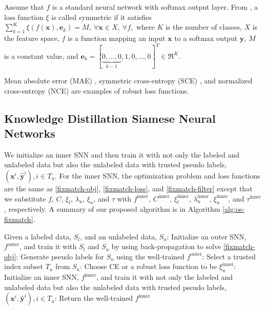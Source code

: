 \documentclass{article}
\def\bx{{\boldsymbol x}}
\def\by{{\boldsymbol y}}
\def\be{{\boldsymbol e}}
\begin{document}
Assume that $f$ is a standard neural network with softmax output layer.
From \cite{AG17a}, a loss function $\xi$ is called symmetric if it satisfies
$\sum_{k=1}^K \xi(f(\bx), \be_k) = M,\ \forall \bx \in X,\ \forall f,$
where $K$ is the number of classes, $X$ is the feature space, 
$f$ is a function mapping an input $\bx$ to a softmax output $\by$, $M$ is a constant value, and
$\be_k = [\underbrace{0, \ldots, 0}_{k-1}, 1, 0, \ldots, 0]^T \in \Re^K$.

Mean absolute error (MAE) \cite{CJW85a}, symmetric cross-entropy (SCE) \cite{YW19a}, and normalized cross-entropy (NCE) \cite{XM20a} are examples of robust loss functions.

\subsection{Knowledge Distillation Siamese Neural Networks}
\label{subsec:dual-TS}

We initialize an inner SNN and then train it with not only the labeled and unlabeled data but also the unlabeled data with trusted pseudo labels, $(\bx^i, \hat{\by}^i), i \in T_u$.
For the inner SNN, the optimization problem and loss functions are the same as \eqref{fixmatch-obj}, \eqref{fixmatch-loss}, and \eqref{fixmatch-filter} except that
we substitute $f$, $C$, $\xi_l$, $\lambda_u$, $\xi_u$, and $\tau$  with $f^{\text{inner}}$, $C^{\text{inner}}$, $\xi^{\text{inner}}_l$, $\lambda^{\text{inner}}_u$, $\xi^{\text{inner}}_u$, and $\tau^{\text{inner}}$, respectively.
A summary of our proposed algorithm is in Algorithm \ref{alg:os-fixmatch}.

\setcounter{algocf}{0}
\begin{algorithm}[t]
    Given a labeled data, $S_l$, and an unlabeled data, $S_u$: Initialize an outer SNN, $f^{\text{outer}}$, and train it with $S_l$ and $S_u$ by using back-propagation to
    solve \eqref{fixmatch-obj}: Generate pseudo labels for $S_u$ using the well-trained $f^{\text{outer}}$: Select a trusted index subset $T_u$ from $S_u$: Choose CE or a robust loss function to be $\xi^{\text{inner}}_u$: Initialize an inner SNN, $f^{\text{inner}}$, and train it with not only the labeled and unlabeled data but also the unlabeled data with trusted pseudo labels, $(\bx^i, \hat{\by}^i), i \in T_u$: Return the well-trained $f^{\text{inner}}$\;
    \caption{KD-FixMatch}
\label{alg:os-fixmatch}
\end{algorithm}
\end{document}
